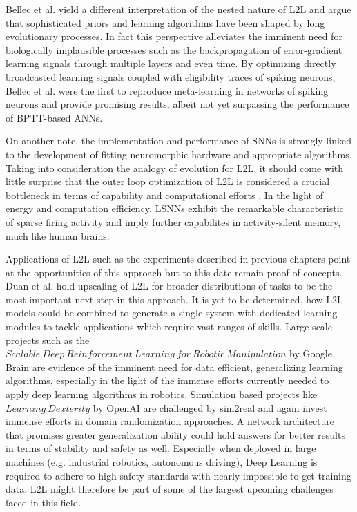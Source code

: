 \documentclass[letterpaper, 10 pt, conference]{ieeeconf}  %
\begin{document}
Bellec et al.\cite{bellecLongShorttermMemory2018} yield a different interpretation of the nested nature of L2L and argue that 
sophisticated priors and learning algorithms have been
shaped by long evolutionary processes. In fact this perspective alleviates the imminent need for biologically implausible processes such as the 
backpropagation of error-gradient learning signals through multiple layers and even time. By optimizing directly broadcasted learning signals coupled
with eligibility traces of spiking neurons, Bellec et al. were the first to reproduce meta-learning in networks of spiking neurons and provide 
promising results, albeit not yet surpassing the performance of BPTT-based ANNs. \newline

On another note, the implementation and performance of SNNs is strongly linked to the development of fitting neuromorphic hardware and appropriate
algorithms. Taking into consideration the analogy of evolution for L2L, it should come with little surprise that the outer loop optimization of L2L 
is considered a crucial bottleneck in terms of capability and computational efforts \cite{duanBenchmarkingDeepReinforcement}. 
In the light of energy and computation efficiency, 
LSNNs exhibit the remarkable characteristic of sparse firing activity and imply further capabilites in activity-silent memory, much like 
human brains. \newline

Applications of L2L such as the experiments described in previous chapters point at the opportunities of this approach but to this date remain
proof-of-concepts. Duan et al.\cite{duanRLFastReinforcement2016} hold upscaling of L2L for broader distributions of tasks to be 
the most important next step in this approach. It 
is yet to be determined, how L2L models could be combined to generate a single system with dedicated learning modules to tackle applications which 
require vast ranges of skills.
Large-scale projects such as the $Scalable\ Deep\ Reinforcement\ 
Learning\ for\ Robotic\ Manipulation$ by Google Brain\cite{ScalableDeepReinforcement} are evidence of the imminent need for data efficient, 
generalizing learning algorithms, 
especially in the light of the immense efforts currently needed to 
apply deep learning algorithms in robotics. Simulation based projects like $Learning\ Dexterity$ by OpenAI \cite{LearningDexterity2018} 
are challenged by sim2real and 
again invest immense efforts in domain randomization approaches. A network architecture that promises greater generalization ability could hold 
answers for better results in terms of stability and safety as well. Especially when deployed in large machines 
(e.g. industrial robotics, autonomous driving),
Deep Learning is required to adhere to high safety standards with nearly impossible-to-get training data. 
L2L might therefore be part of some of 
the largest upcoming challenges faced in this field.
\end{document}
